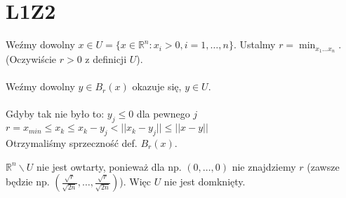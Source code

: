 \documentclass{article}
\title{}
\date{6.10.2020}
\author{Maurycy Borkowski}
\begin{document}
\maketitle

\section{L1Z2}
Weźmy dowolny $x \in U = \{ x \in \mathbb{R}^n : x_i > 0, i = 1,\dots,n\} $. Ustalmy $r = \min_{x_1\dots x_n}$. (Oczywiście $r > 0$ z definicji $U$). \\\\Weźmy dowolny $y \in B_r(x)$ okazuje się,  $y \in U$. \\\\Gdyby tak nie było to: $y_j \leq 0$ dla pewnego $j$ \\ $r = x_{min} \leq x_k \leq x_k - y_j < ||x_k - y_j|| \leq ||x - y|| $
\\Otrzymaliśmy sprzeczność def. $B_r(x)$.

$\mathbb{R}^n \backslash U$ nie jest owtarty, ponieważ dla np. $(0,\dots,0)$ nie znajdziemy $r$ (zawsze będzie np. $(\frac{\sqrt r}{\sqrt {2n}}, \dots, \frac{\sqrt r}{\sqrt {2n}})$). Więc $U$ nie jest domknięty.
\end{document}
